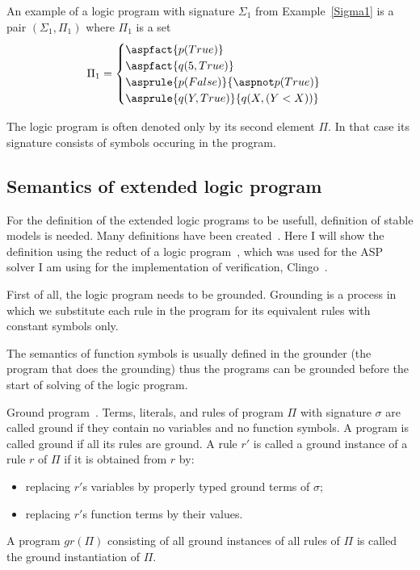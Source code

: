 \begin{example}\label{exp:logic_program1}
    An example of a logic program with signature $\Sigma_1$ from Example~\ref{Sigma1}
    is a pair $(\Sigma_1, \Pi_1)$ where $\Pi_1$ is a set
    \begin{equation*}
        \Pi_1 =
            \begin{cases}
                \aspfact{p(True)}\\
                \aspfact{q(5, True)}\\
                \asprule{p(False)}{\aspnot p(True)}\\
                \asprule{q(Y, True)}{q(X, (Y < X))}
            \end{cases}
    \end{equation*}
\end{example}

The logic program is often denoted only by its second element $\Pi$.
In that case its signature consists of symbols occuring in the program.


\subsection{Semantics of extended logic program}

For the definition of the extended logic programs to be usefull,
definition of stable models is needed.
Many definitions have been created~\cite{12definitions}.
Here I will show the definition using the reduct
of a logic program~\cite{KRHandbook},
which was used for the ASP solver I am using for the implementation
of verification, Clingo~\cite{GebserKKS17}.

First of all, the logic program needs to be grounded.
Grounding is a process in which we substitute each rule
in the program for its equivalent rules with constant symbols only.

The semantics of function symbols is usually defined in the groun\-d\-er
(the program that does the grounding)
thus the programs can be grounded before the start of solving
of the logic program.

\begin{definition}{Ground program~\cite{KRHandbook}.}
    Terms, literals, and rules of program $\Pi$ with signature $\sigma$ are called ground if they
    contain no variables and no function symbols. A program is called
    ground if all its rules are ground. A rule $r'$ is called a ground instance of a rule $r$ of $\Pi$
    if it is obtained from $r$ by:
    \begin{itemize}
        \item replacing $r'$s variables by properly typed ground terms of $\sigma$;
        \item replacing $r'$s function terms by their values.
    \end{itemize}
    A program $gr(\Pi)$ consisting of all ground instances of all rules of $\Pi$
    is called the ground instantiation of $\Pi$.
\end{definition}

